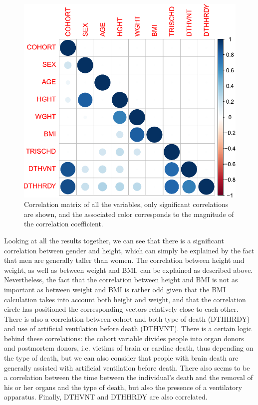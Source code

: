 \documentclass[a4paper, 11pt]{article}
\begin{document}
\begin{multicols}{2}
\begin{figure}[H]
	\centering
	\includegraphics[width=\columnwidth]{figures/clinical_correlation_plots/corrected_allCorrelations2}
	\caption{Correlation matrix of all the variables, only significant correlations are shown, and the associated color corresponds to the magnitude of the correlation coefficient.}
	\label{fig:allCor}
\end{figure}

Looking at all the results together, we can see that there is a significant correlation between gender and height, which can simply be explained by the fact that men are generally taller than women. 
The correlation between height and weight, as well as between weight and BMI, can be explained as described above. 
Nevertheless, the fact that the correlation between height and BMI is not as important as between weight and BMI is rather odd given that the BMI calculation takes into account both height and weight, and that the correlation circle has positioned the corresponding vectors relatively close to each other. 
There is also a correlation between cohort and both type of death (DTHHRDY) and use of artificial ventilation before death (DTHVNT). 
There is a certain logic behind these correlations: the cohort variable divides people into organ donors and postmortem donors, i.e. victims of brain or cardiac death, thus depending on the type of death, but we can also consider that people with brain death are generally assisted with artificial ventilation before death. 
There also seems to be a correlation between the time between the individual's death and the removal of his or her organs and the type of death, but also the presence of a ventilatory apparatus. 
Finally, DTHVNT and DTHHRDY are also correlated.


\end{multicols}
\end{document}
